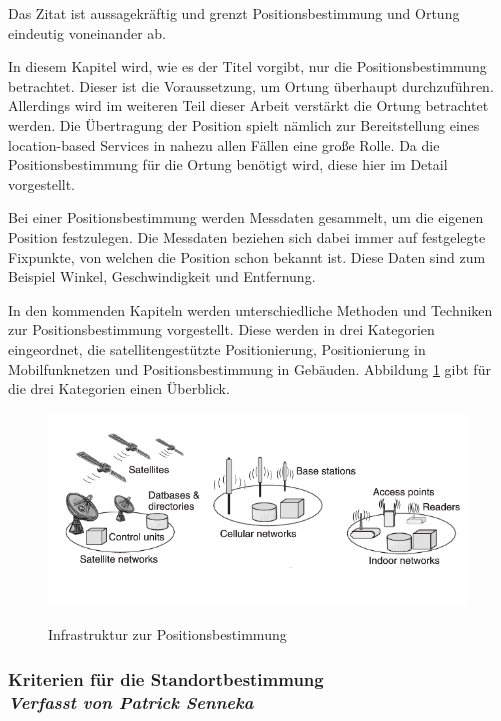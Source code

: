 Das Zitat ist aussagekräftig und grenzt Positionsbestimmung und Ortung eindeutig voneinander ab.

In diesem Kapitel wird, wie es der Titel vorgibt, nur die Positionsbestimmung betrachtet. Dieser ist die Voraussetzung, um Ortung
überhaupt durchzuführen. Allerdings wird im weiteren Teil dieser Arbeit verstärkt die Ortung betrachtet werden. Die Übertragung der Position spielt nämlich zur Bereitstellung eines location-based Services in nahezu allen Fällen eine große Rolle. Da die Positionsbestimmung für die Ortung benötigt wird, diese hier im Detail vorgestellt. 


Bei einer Positionsbestimmung werden Messdaten gesammelt, um die eigenen Position festzulegen. Die Messdaten beziehen sich dabei immer auf festgelegte Fixpunkte, von welchen die Position schon bekannt ist.  Diese Daten sind zum Beispiel Winkel, Geschwindigkeit und Entfernung.

In den kommenden Kapiteln werden unterschiedliche Methoden und Techniken zur Positionsbestimmung vorgestellt. Diese werden in drei Kategorien eingeordnet, die satellitengestützte Positionierung, Positionierung in Mobilfunknetzen und Positionsbestimmung in Gebäuden.
Abbildung \ref{fig:Positionsbestimmung} gibt für die drei Kategorien einen Überblick.

\begin{figure}[h]
\centering
\includegraphics[width=0.99\textwidth]{ref/images/Positionsbestimmung.PNG}
\caption[Infrastruktur zur Positionsbestimmung]{Infrastruktur zur Positionsbestimmung}
\label{fig:Positionsbestimmung}
\cite[S. 124]{Kuepper2005}
\end{figure}

\subsubsection[Kriterien für die Standortbestimmung]{Kriterien für die Standortbestimmung
 \\ \textnormal{\small{\textit {Verfasst von Patrick Senneka}}}}

